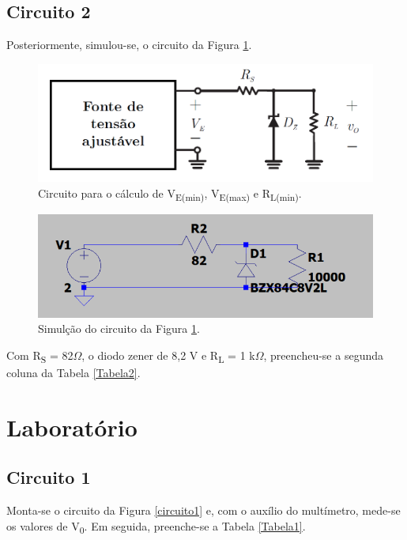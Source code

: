 \documentclass[journal, a4paper]{IEEEtran}
\begin{document}
    \subsection{Circuito 2}
    Posteriormente, simulou-se, o circuito da Figura \ref{circuito2}.
     
     \begin{figure}[H]
		\begin{center}
		\includegraphics[width=\columnwidth]{Figura_2.PNG}
		\caption{Circuito para o cálculo de V\textsubscript{E(min)}, V\textsubscript{E(max)} e R\textsubscript{L(min)}.}
		\label{circuito2}
		\end{center}
	\end{figure}
    
    \begin{figure}[H]
		\begin{center}
		\includegraphics[width=\columnwidth]{Simulacao2.PNG}
		\caption{Simulção do circuito da Figura \ref{circuito2}.}
		\label{simulação2}
		\end{center}
	\end{figure}
    
    Com R\textsubscript{S} = 82$\Omega$, o diodo zener de 8,2 V e R\textsubscript{L} = 1 k$\Omega$, preencheu-se a segunda coluna da Tabela \ref{Tabela2}.








\section{Laboratório}
	\subsection{Circuito 1}
    Monta-se o circuito da Figura \ref{circuito1} e, com o auxílio do multímetro, mede-se os valores de V\textsubscript{0}. Em seguida, preenche-se a Tabela \ref{Tabela1}.
\end{document}
